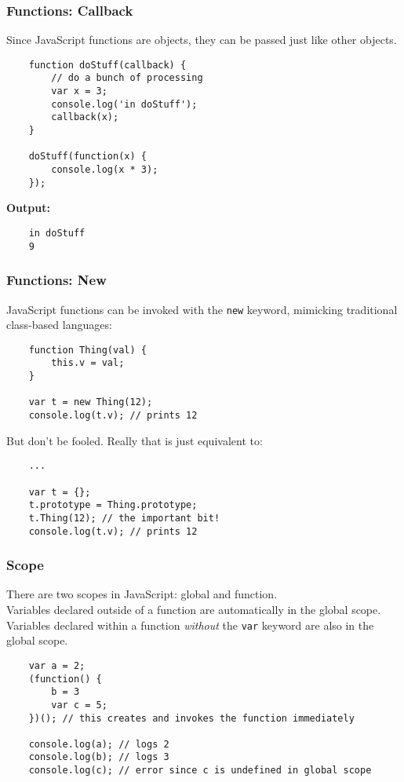 \documentclass{lug}
\begin{document}
\begin{frame}[fragile]
    \frametitle{Functions: Callback}
    Since JavaScript functions are objects, they can be passed just like other objects.

    \begin{verbatim}
    function doStuff(callback) {
        // do a bunch of processing
        var x = 3;
        console.log('in doStuff');
        callback(x);
    }

    doStuff(function(x) {
        console.log(x * 3);
    });
    \end{verbatim}

    \textbf{Output:}
    \begin{verbatim}
    in doStuff
    9
    \end{verbatim}
\end{frame}

\begin{frame}[fragile]
    \frametitle{Functions: New}
    JavaScript functions can be invoked with the \texttt{new} keyword, mimicking traditional
    class-based languages:

    \begin{verbatim}
    function Thing(val) {
        this.v = val;
    }

    var t = new Thing(12);
    console.log(t.v); // prints 12
    \end{verbatim}

    But don't be fooled. Really that is just equivalent to:

    \begin{verbatim}
    ...

    var t = {};
    t.prototype = Thing.prototype;
    t.Thing(12); // the important bit!
    console.log(t.v); // prints 12
    \end{verbatim}
\end{frame}

\begin{frame}[fragile]
    \frametitle{Scope}

    There are two scopes in JavaScript: global and function.\footnotemark[1] \\

    Variables declared outside of a function are automatically in the global scope.\\

    Variables declared within a function \textit{without} the \texttt{var} keyword are also in the
    global scope.

    \begin{verbatim}
    var a = 2;
    (function() {
        b = 3
        var c = 5;
    })(); // this creates and invokes the function immediately

    console.log(a); // logs 2
    console.log(b); // logs 3
    console.log(c); // error since c is undefined in global scope
    \end{verbatim}
\end{frame}
\end{document}
